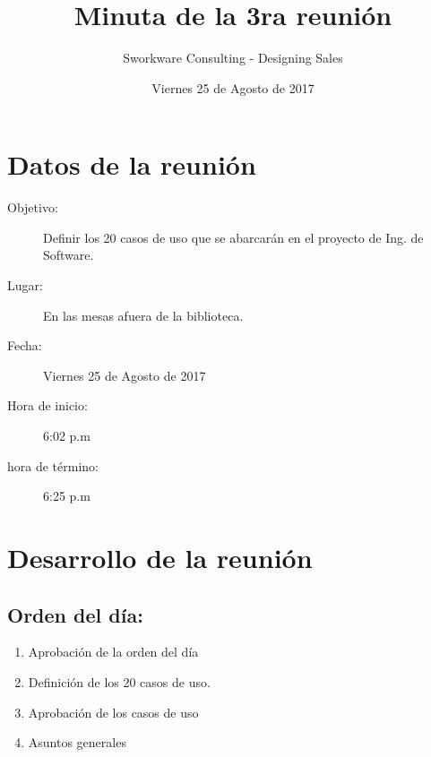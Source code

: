 \documentclass[12pt]{article}
\title{Minuta de la 3ra reunión}
\author{Sworkware Consulting - Designing Sales}
\date{Viernes 25 de Agosto de 2017} %
\begin{document}
\maketitle
\tableofcontents

\section{Datos de la reunión}
\begin{description}
	\item[Objetivo:] Definir los 20 casos de uso que se abarcarán en el proyecto de Ing. de Software.
	\item[Lugar:] En las mesas afuera de la biblioteca.
	\item[Fecha:] Viernes 25 de Agosto de 2017
	\item[Hora de inicio:] 6:02 p.m
	\item[hora de término:] 6:25 p.m
\end{description}

\section{Desarrollo de la reunión}

\subsection{Orden del día:}
\begin{enumerate}
 	\item Aprobación de la orden del día
	\item Definición de los 20 casos de uso.
	\item Aprobación de los casos de uso
	\item Asuntos generales
\end{enumerate}
\end{document}
